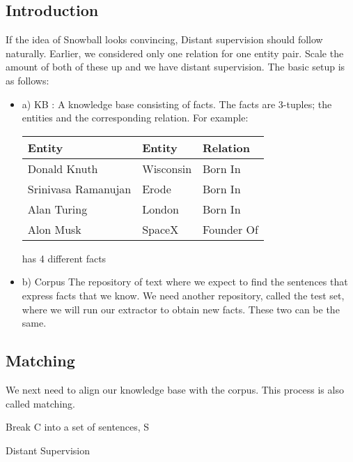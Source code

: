 \documentclass[a4paper,10pt]{article}
\begin{document}
\subsection{Introduction}
If the idea of Snowball looks convincing, Distant supervision should follow naturally.
Earlier, we considered only one relation for one entity pair. Scale the amount of both of these up
and we have distant supervision.
The basic setup is as follows:
\begin{itemize}

\item a) KB : A knowledge base consisting of facts. The facts are 3-tuples; the entities and the corresponding relation.
For example:
\begin{center}
\begin{tabular}{|l|l|l|}
\hline
Entity & Entity & Relation \\
\hline
Donald Knuth & Wisconsin & Born In\\
Srinivasa Ramanujan & Erode & Born In \\
Alan Turing & London & Born In \\
Alon Musk & SpaceX & Founder Of\\
\hline
\end{tabular}
\end{center}
has 4 different facts

\item b) Corpus
The repository of text where we expect to find the sentences that express facts that we know.
We need another repository, called the test set, where we will run our extractor to obtain new facts.
These two can be the same.
\end{itemize}

\subsection{Matching}
We next need to align our knowledge base with the corpus. This process is also called matching.
  
\begin{algorithm}[H]
 Break C into a set of sentences, S\;
 \caption{Distant Supervision}
\end{algorithm}
\end{document}
